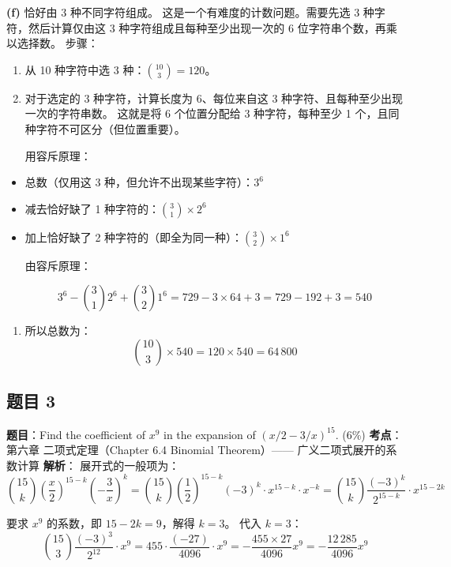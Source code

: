 \documentclass[10pt,a4paper,openany]{ctexbook}
\theoremstyle{definition}
\theoremstyle{remark}
\begin{document}
\textbf{(f)} 恰好由 3 种不同字符组成。
这是一个有难度的计数问题。需要先选 3 种字符，然后计算仅由这 3 种字符组成且每种至少出现一次的 6 位字符串个数，再乘以选择数。
步骤：
\begin{enumerate}
\item 从 10 种字符中选 3 种：$\binom{10}{3} = 120$。
\item 对于选定的 3 种字符，计算长度为 6、每位来自这 3 种字符、且每种至少出现一次的字符串数。
这就是将 6 个位置分配给 3 种字符，每种至少 1 个，且同种字符不可区分（但位置重要）。

用容斥原理：

\end{enumerate}

\begin{itemize}
\item 总数（仅用这 3 种，但允许不出现某些字符）：$3^6$
\item 减去恰好缺了 1 种字符的：$\binom{3}{1} \times 2^6$
\item 加上恰好缺了 2 种字符的（即全为同一种）：$\binom{3}{2} \times 1^6$

由容斥原理：

\[
   3^6 - \binom{3}{1}2^6 + \binom{3}{2}1^6 = 729 - 3 \times 64 + 3 = 729 - 192 + 3 = 540
\]


\end{itemize}

\begin{enumerate}
\item 所以总数为：
\[
   \binom{10}{3} \times 540 = 120 \times 540 = 64\,800
\]


\end{enumerate}

\vspace{-2pt}

\subsection{题目 3}

\textbf{题目}：Find the coefficient of $x^9$ in the expansion of $(x/2 - 3/x)^{15}$. (6\%)
\textbf{考点}：第六章 二项式定理（Chapter 6.4 Binomial Theorem）—— 广义二项式展开的系数计算
\textbf{解析}：
展开式的一般项为：
\[
\binom{15}{k} \left(\frac{x}{2}\right)^{15-k} \left(-\frac{3}{x}\right)^k = \binom{15}{k} \left(\frac{1}{2}\right)^{15-k} (-3)^k \cdot x^{15-k} \cdot x^{-k}
= \binom{15}{k} \frac{(-3)^k}{2^{15-k}} \cdot x^{15-2k}
\]

要求 $x^9$ 的系数，即 $15 - 2k = 9$，解得 $k = 3$。
代入 $k = 3$：
\[
\binom{15}{3} \frac{(-3)^3}{2^{12}} \cdot x^{9}
= 455 \cdot \frac{(-27)}{4096} \cdot x^{9}
= -\frac{455 \times 27}{4096} x^{9}
= -\frac{12\,285}{4096} x^{9}
\]
\end{document}
